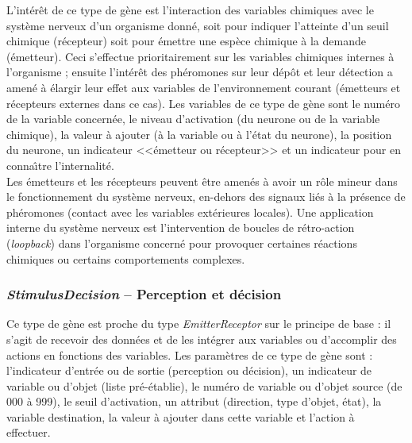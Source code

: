\documentclass[11pt,twoside,a4paper]{article}
\begin{document}
L'int{\'e}r{\^e}t de ce type de g{\`e}ne est l'interaction des variables chimiques avec le syst{\`e}me nerveux d'un organisme donn{\'e}, soit pour indiquer l'atteinte d'un seuil chimique (r{\'e}cepteur) soit pour {\'e}mettre une esp{\`e}ce chimique {\`a} la demande ({\'e}metteur). Ceci s'effectue prioritairement sur les variables chimiques internes {\`a} l'organisme ; ensuite l'int{\'e}r{\^e}t des ph{\'e}romones sur leur d{\'e}p{\^o}t et leur d{\'e}tection a amen{\'e} {\`a} {\'e}largir leur effet aux variables de l'environnement courant ({\'e}metteurs et r{\'e}cepteurs externes dans ce cas). Les variables de ce type de g{\`e}ne sont le num{\'e}ro de la variable concern{\'e}e, le niveau d'activation (du neurone ou de la variable chimique), la valeur {\`a} ajouter ({\`a} la variable ou {\`a} l'{\'e}tat du neurone), la position du neurone, un indicateur <<{\'e}metteur ou r{\'e}cepteur>> et un indicateur pour en conna{\^\i}tre l'internalit{\'e}.~\\

Les {\'e}metteurs et les r{\'e}cepteurs peuvent {\^e}tre amen{\'e}s {\`a} avoir un r{\^o}le mineur dans le fonctionnement du syst{\`e}me nerveux, en-dehors des signaux li{\'e}s {\`a} la pr{\'e}sence de ph{\'e}romones (contact avec les variables ext{\'e}rieures locales). Une application interne du syst{\`e}me nerveux est l'intervention de boucles de r{\'e}tro-action (\emph{loopback}) dans l'organisme concern{\'e} pour provoquer certaines r{\'e}actions chimiques ou certains comportements complexes. 

\subsubsection{\emph{StimulusDecision} -- Perception et d{\'e}cision}

Ce type de g{\`e}ne est proche du type \emph{EmitterReceptor} sur le principe de base : il s'agit de recevoir des donn{\'e}es et de les int{\'e}grer aux variables ou d'accomplir des actions en fonctions des variables. Les param{\`e}tres de ce type de g{\`e}ne sont : l'indicateur d'entr{\'e}e ou de sortie (perception ou d{\'e}cision), un indicateur de variable ou d'objet (liste pr{\'e}-{\'e}tablie), le num{\'e}ro de variable ou d'objet source (de 000 {\`a} 999), le seuil d'activation, un attribut (direction, type d'objet, {\'e}tat), la variable destination, la valeur {\`a} ajouter dans cette variable et l'action {\`a} effectuer.~\\
\end{document}
